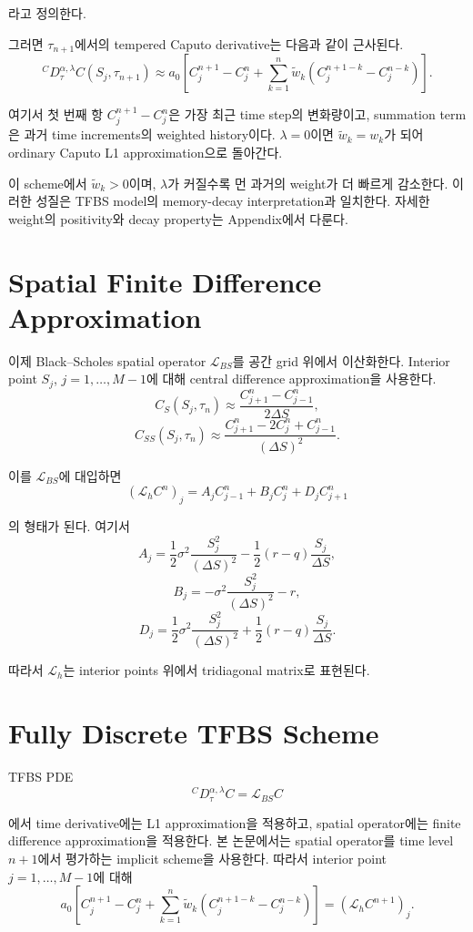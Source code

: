 \documentclass[11pt,a4paper]{report}
\begin{document}
라고 정의한다.

그러면 $\tau_{n+1}$에서의 tempered Caputo derivative는 다음과 같이 근사된다.
\[
{}^C D_\tau^{\alpha,\lambda} C(S_j,\tau_{n+1})
\approx
a_0
\left[
C_j^{n+1}-C_j^n
+
\sum_{k=1}^{n}
\widetilde w_k
\left(
C_j^{n+1-k}-C_j^{n-k}
\right)
\right].
\]

여기서 첫 번째 항 $C_j^{n+1}-C_j^n$은 가장 최근 time step의 변화량이고, summation term은 과거 time increments의 weighted history이다. $\lambda=0$이면 $\widetilde w_k=w_k$가 되어 ordinary Caputo L1 approximation으로 돌아간다.

이 scheme에서 $\widetilde w_k>0$이며, $\lambda$가 커질수록 먼 과거의 weight가 더 빠르게 감소한다. 이러한 성질은 TFBS model의 memory-decay interpretation과 일치한다. 자세한 weight의 positivity와 decay property는 Appendix에서 다룬다.

\section{Spatial Finite Difference Approximation}

이제 Black--Scholes spatial operator $\mathcal{L}_{BS}$를 공간 grid 위에서 이산화한다. Interior point $S_j$, $j=1,\dots,M-1$에 대해 central difference approximation을 사용한다.
\[
C_S(S_j,\tau_n)
\approx
\frac{C_{j+1}^n-C_{j-1}^n}{2\Delta S},
\]
\[
C_{SS}(S_j,\tau_n)
\approx
\frac{C_{j+1}^n-2C_j^n+C_{j-1}^n}{(\Delta S)^2}.
\]

이를 $\mathcal{L}_{BS}$에 대입하면
\[
(\mathcal{L}_h C^n)_j
=
A_j C_{j-1}^n
+
B_j C_j^n
+
D_j C_{j+1}^n
\]

의 형태가 된다. 여기서
\[
A_j
=
\frac{1}{2}\sigma^2\frac{S_j^2}{(\Delta S)^2}
-
\frac{1}{2}(r-q)\frac{S_j}{\Delta S},
\]
\[
B_j
=
-\sigma^2\frac{S_j^2}{(\Delta S)^2}
-
r,
\]
\[
D_j
=
\frac{1}{2}\sigma^2\frac{S_j^2}{(\Delta S)^2}
+
\frac{1}{2}(r-q)\frac{S_j}{\Delta S}.
\]

따라서 $\mathcal{L}_h$는 interior points 위에서 tridiagonal matrix로 표현된다.

\section{Fully Discrete TFBS Scheme}

TFBS PDE
\[
{}^C D_\tau^{\alpha,\lambda}C
=
\mathcal{L}_{BS}C
\]

에서 time derivative에는 L1 approximation을 적용하고, spatial operator에는 finite difference approximation을 적용한다. 본 논문에서는 spatial operator를 time level $n+1$에서 평가하는 implicit scheme을 사용한다. 따라서 interior point $j=1,\dots,M-1$에 대해
\[
a_0
\left[
C_j^{n+1}-C_j^n
+
\sum_{k=1}^{n}
\widetilde w_k
\left(
C_j^{n+1-k}-C_j^{n-k}
\right)
\right]
=
(\mathcal{L}_h C^{n+1})_j.
\]
\end{document}
